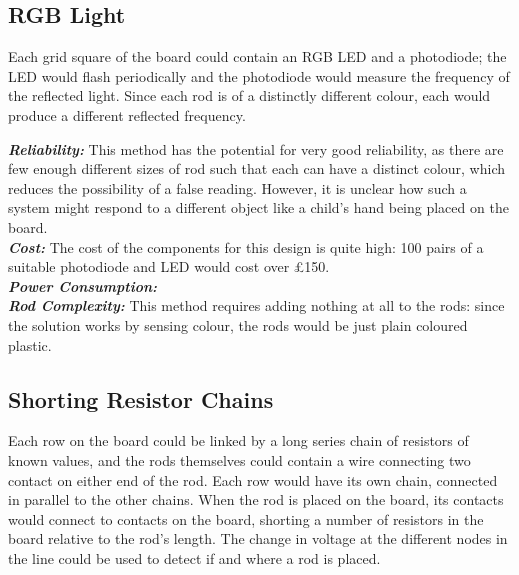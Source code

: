 
\subsection{RGB Light}
\label{rgb}

Each grid square of the board could contain an RGB LED and a photodiode; the LED would flash periodically and the photodiode would measure the frequency of the reflected light. Since each rod is of a distinctly different colour, each would produce a different reflected frequency.\\

{
\setlength{\parindent}{0pt} 

\textbf{\textit{Reliability:}} This method has the potential for very good reliability, as there are few enough different sizes of rod such that each can have a distinct colour, which reduces the possibility of a false reading. However, it is unclear how such a system might respond to a different object like a child's hand being placed on the board. \\

\textbf{\textit{Cost:}} The cost of the components for this design is quite high: 100 pairs of a suitable photodiode \cite{KPS5130P52:online} and LED \cite{L154A4SU86:online} would cost over £150.  \\

\textbf{\textit{Power Consumption:}} \\

\textbf{\textit{Rod Complexity:}} This method requires adding nothing at all to the rods: since the solution works by sensing colour, the rods would be just plain coloured plastic.\\
}


\subsection{Shorting Resistor Chains}
\label{resistors}

Each row on the board could be linked by a long series chain of resistors of known values, and the rods themselves could contain a wire connecting two contact on either end of the rod. Each row would have its own chain, connected in parallel to the other chains. When the rod is placed on the board, its contacts would connect to contacts on the board, shorting a number of resistors in the board relative to the rod's length. The change in voltage at the different nodes in the line could be used to detect if and where a rod is placed.\\

